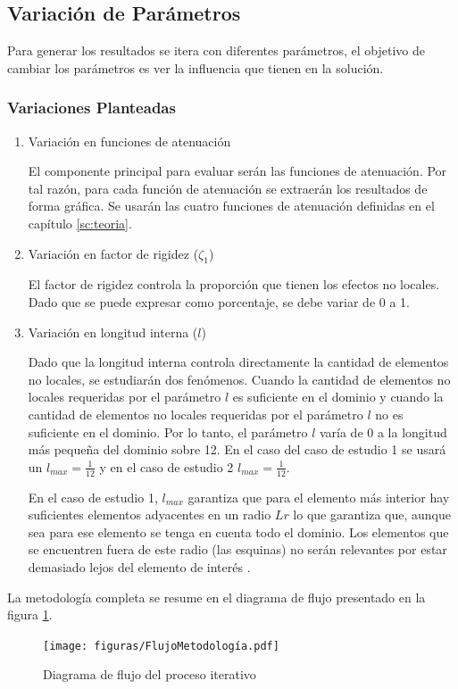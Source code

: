 	\subsection{Variación de Parámetros}
	\label{sub:variacion}
		Para generar los resultados se itera con diferentes parámetros, el objetivo de cambiar los parámetros es ver la influencia que tienen en la solución.
		\subsubsection{Variaciones Planteadas}
			\begin{enumerate}
				\item Variación en funciones de atenuación

				El componente principal para evaluar serán las funciones de atenuación. Por tal razón, para cada función de atenuación se extraerán los resultados de forma gráfica. Se usarán las cuatro funciones de atenuación definidas en el capítulo \ref{sc:teoria}.
				\item Variación en factor de rigidez ($\zeta_1$)

				El factor de rigidez controla la proporción que tienen los efectos no locales. Dado que se puede expresar como porcentaje, se debe variar de 0 a 1.
				\item Variación en longitud interna ($l$)

				Dado que la longitud interna controla directamente la cantidad de elementos no locales, se estudiarán dos fenómenos. Cuando la cantidad de elementos no locales requeridas por el parámetro $l$ es suficiente en el dominio y cuando la cantidad de elementos no locales requeridas por el parámetro $l$ no es suficiente en el dominio. Por lo tanto, el parámetro $l$ varía de 0 a la longitud más pequeña del dominio sobre 12. En el caso del caso de estudio 1 se usará un $l_{max}=\frac{1}{12}$ y en el caso de estudio 2 $l_{max}=\frac{1}{12}$.

				En el caso de estudio 1, $l_{max}$ garantiza que para el elemento más interior hay suficientes elementos adyacentes en un radio $Lr$ lo que garantiza que, aunque sea para ese elemento se tenga en cuenta todo el dominio. Los elementos que se encuentren fuera de este radio (las esquinas) no serán relevantes por estar demasiado lejos del elemento de interés \parencite{Polizzotto2001}. 
			\end{enumerate}
	La metodología completa se resume en el diagrama de flujo presentado en la figura \ref{fig:flowchart}.

	\begin{figure}
		\centering
		\sffamily
		\texttt{[image: figuras/FlujoMetodología.pdf]}
		\caption{Diagrama de flujo del proceso iterativo}
		\label{fig:flowchart}
	\end{figure}